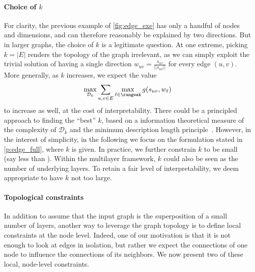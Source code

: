 \paragraph{Choice of $k$}
\label{par:edge_choose_k}

For clarity, the previous example of \autoref{fig:edge_exe} has only a handful of nodes and
dimensions, and can therefore reasonably be explained by two directions. But in larger graphs, the
choice of $k$ is a legitimate question.
At one extreme, picking $k=|E|$ renders the topology of the graph
irrelevant, as we can simply exploit the trivial
solution of having a single direction $w_{uv} = \frac{s_{uv}}{||s_{uv}||}$ for every edge $(u,v)$.
More generally, as $k$ increases, we expect the value \[\max_{\mathcal{D}_k} \sum_{u,v \in E}
\max_{\ell \in \rangesk} g(s_{uv}, w_{\ell})\] to increase as
well, at the cost of interpretability. There could be a principled approach to finding the
\enquote{best} $k$, based on a information theoretical measure of the complexity of $\mathcal{D}_k$
and the minimum description length principle~\autocite{grunwald2005tutorial}. However, in the
interest of simplicity, in the following we focus on the formulation stated in
\autoref{p:edge_full}, where $k$ is given. In practice, we further constrain $k$ to be small (say
less than ). Within the multilayer framework, $k$ could also be seen as the number of
underlying layers. To retain a fair level of interpretability, we deem appropriate to have $k$ not
too large.

\paragraph{Topological constraints}

In addition to assume that the input graph is the superposition of a small number of layers,
another way to leverage the graph topology is to define local constraints at the node level.
Indeed, one of our motivation is that it is not enough to look at edges in isolation, but rather we
expect the connections of one node to influence the connections of its neighbors. We now present two
of these local, node-level constraints. 

